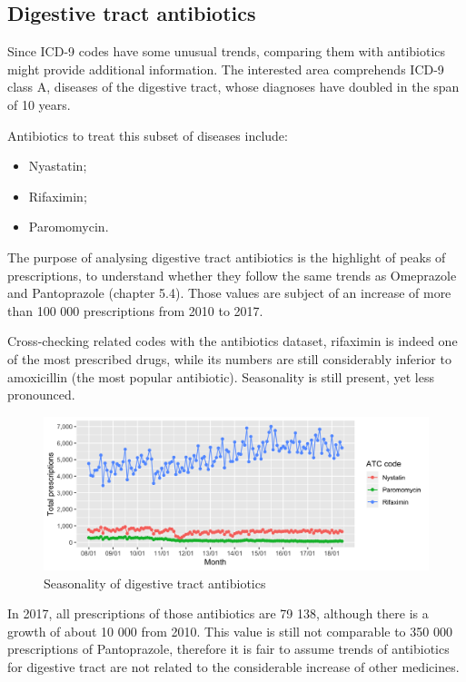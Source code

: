 \subsection{Digestive tract antibiotics}
Since ICD-9 codes have some unusual trends, comparing them with antibiotics might provide additional information. The interested area comprehends ICD-9 class A, diseases of the digestive tract, whose diagnoses have doubled in the span of 10 years. 

Antibiotics to treat this subset of diseases include:
\begin{itemize}
	\item Nyastatin;
	\item Rifaximin;
	\item Paromomycin.
\end{itemize}

The purpose of analysing digestive tract antibiotics is the highlight of peaks of prescriptions, to understand whether they follow the same trends as Omeprazole and Pantoprazole (chapter 5.4). Those values are subject of an increase of more than 100 000 prescriptions from 2010 to 2017.

Cross-checking related codes with the antibiotics dataset, rifaximin is indeed one of the most prescribed drugs, while its numbers are still considerably inferior to amoxicillin (the most popular antibiotic). Seasonality is still present, yet less pronounced. 

\begin{figure}[h]
	\centering
	\includegraphics[scale=0.3]{../plots/top_atc_a-month.png}
	\caption{\small Seasonality of digestive tract antibiotics}
\end{figure}

In 2017, all prescriptions of those antibiotics are 79 138, although there is a growth of about 10 000 from 2010. This value is still not comparable to 350 000 prescriptions of Pantoprazole, therefore it is fair to assume trends of antibiotics for digestive tract are not related to the considerable increase of other medicines.

